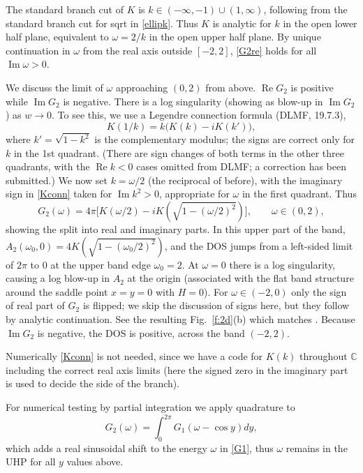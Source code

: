 \documentclass[11pt]{article}
\newcommand{\be}{\begin{equation}}
\newcommand{\ee}{\end{equation}}
\newcommand{\C}{\mathbb{C}}
\DeclareMathOperator{\re}{Re}
\DeclareMathOperator{\im}{Im}
\newcommand{\om}{\omega}
\begin{document}
The standard branch cut of $K$ is $k\in(-\infty,-1)\cup (1,\infty)$,
following from the standard
branch cut for sqrt in \eqref{ellipk}.
Thus $K$ is analytic for $k$ in the open lower half plane,
equivalent to $\om = 2/k$ in the open upper half plane.
By unique continuation in $\om$ from the real axis outside $[-2,2]$,
\eqref{G2re} holds for all $\im \om >0$.

We discuss the limit of $\om$ approaching $(0,2)$ from above.
$\re G_2$ is positive while $\im G_2$ is negative.
There is a log singularity (showing as blow-up in $\im G_2$)
as $w\to 0$.
To see this, we use a Legendre connection formula (DLMF, 19.7.3),
\be
K(1/k) = k\big( K(k) - iK(k') \big),
\label{Kconn}
\ee
where $k'=\sqrt{1-k^2}$ is the complementary modulus; the signs
are correct only for $k$ in the 1st quadrant. (There are
sign changes of both terms in the other three quadrants,
with the $\re k < 0$ cases omitted from DLMF; a correction has been
submitted.)
We now set $k=\om/2$ (the reciprocal of before),
with the imaginary sign in \eqref{Kconn} taken for $\im k^2 > 0$, appropriate
for $\om$ in the first quadrant.
Thus
\[
G_2(\om) = 4\pi \bigl[ K(\om/2) -i K(\sqrt{1-(\om/2)^2}) \bigr],
\qquad \om \in (0,2),
\]
showing the split into real and imaginary parts.
In this upper part of the band, $A_2(\om_0,0) = 4K(\sqrt{1-(\om_0/2)^2})$,
and the DOS jumps from a left-sided limit of $2\pi$ to $0$ at
the upper band edge $\om_0=2$.
At $\om=0$ there is a log singularity, causing a log blow-up
in $A_2$ at the origin (associated with the flat band structure
around the saddle point $x=y=0$ with $H=0$).
For $\om \in (-2,0)$ only the sign of real part of $G_2$ is flipped;
we skip the discussion of signs here, but they follow by analytic
continuation.
See the resulting Fig.~\ref{f:2d}(b) which matches \cite[Fig.~5.7]{economou}.
Because $\im G_2$ is negative, the DOS is positive, across the band $(-2,2)$.

Numerically \eqref{Kconn} is not needed, since we have a code for
$K(k)$ throughout $\C$ including the correct real axis limits
(here the signed zero in the imaginary part is used to decide
the side of the branch).

For numerical testing by partial integration we apply quadrature to
\be
G_2(\om) = \int_{0}^{2\pi} G_1(\om - \cos y) dy,
\ee
which adds a real sinusoidal shift to the energy $\om$ in \eqref{G1},
thus $\om$ remains in the UHP for all $y$ values above.




\end{document}
